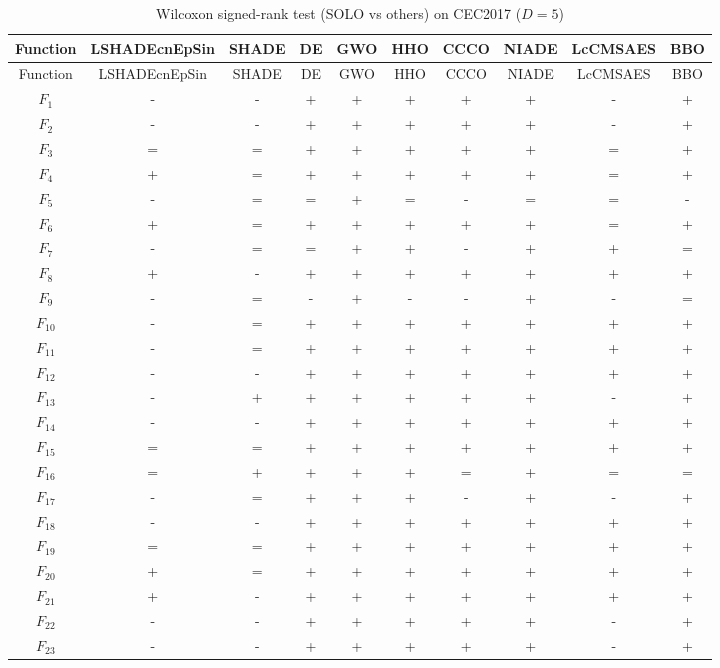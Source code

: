 \begin{center}
\small
\renewcommand{\arraystretch}{1.25}
\begin{longtable}{cccccccccc}
\caption{Wilcoxon signed-rank test (SOLO vs others) on CEC2017 ($D=5$) }
\label{tab:wilcoxon_CEC2017_5} \\
\toprule
Function & LSHADEcnEpSin & SHADE & DE & GWO & HHO & CCCO & NIADE & LcCMSAES & BBO \\
\midrule
\endfirsthead
\toprule
Function & LSHADEcnEpSin & SHADE & DE & GWO & HHO & CCCO & NIADE & LcCMSAES & BBO \\
\midrule
\endhead
$F_{1}$ & - & - & + & + & + & + & + & - & + \\
$F_{2}$ & - & - & + & + & + & + & + & - & + \\
$F_{3}$ & = & = & + & + & + & + & + & = & + \\
$F_{4}$ & + & = & + & + & + & + & + & = & + \\
$F_{5}$ & - & = & = & + & = & - & = & = & - \\
$F_{6}$ & + & = & + & + & + & + & + & = & + \\
$F_{7}$ & - & = & = & + & + & - & + & + & = \\
$F_{8}$ & + & - & + & + & + & + & + & + & + \\
$F_{9}$ & - & = & - & + & - & - & + & - & = \\
$F_{10}$ & - & = & + & + & + & + & + & + & + \\
$F_{11}$ & - & = & + & + & + & + & + & + & + \\
$F_{12}$ & - & - & + & + & + & + & + & + & + \\
$F_{13}$ & - & + & + & + & + & + & + & - & + \\
$F_{14}$ & - & - & + & + & + & + & + & + & + \\
$F_{15}$ & = & = & + & + & + & + & + & + & + \\
$F_{16}$ & = & + & + & + & + & = & + & = & = \\
$F_{17}$ & - & = & + & + & + & - & + & - & + \\
$F_{18}$ & - & - & + & + & + & + & + & + & + \\
$F_{19}$ & = & = & + & + & + & + & + & + & + \\
$F_{20}$ & + & = & + & + & + & + & + & + & + \\
$F_{21}$ & + & - & + & + & + & + & + & + & + \\
$F_{22}$ & - & - & + & + & + & + & + & - & + \\
$F_{23}$ & - & - & + & + & + & + & + & - & + \\

\end{longtable}
\end{center}
